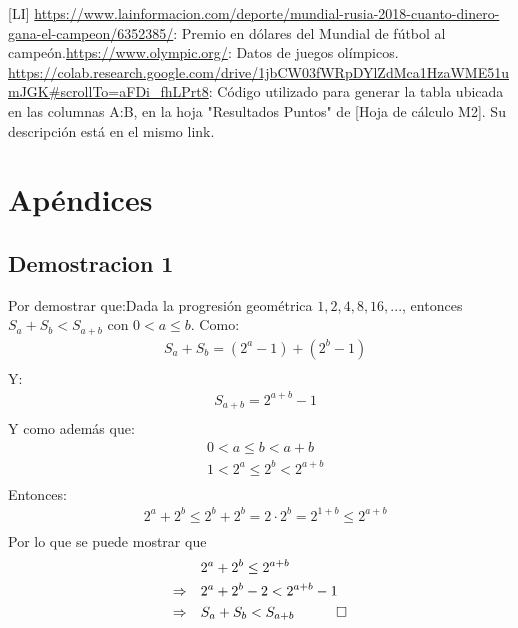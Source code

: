 \documentclass[a4paper]{article}
\begin{document}
[LI] \url{https://www.lainformacion.com/deporte/mundial-rusia-2018-cuanto-dinero-gana-el-campeon/6352385/}: Premio en dólares del Mundial de fútbol al campeón.\newline\newline  [OL] \url{https://www.olympic.org/}: Datos de juegos olímpicos. \newline\newline [Código] \url{https://colab.research.google.com/drive/1jbCW03fWRpDYlZdMca1HzaWME51umJGK#scrollTo=aFDi_fhLPrt8}: Código utilizado para generar la tabla ubicada en las columnas A:B, en la hoja "Resultados Puntos" de [Hoja de cálculo M2]. Su descripción está en el mismo link. 

\newpage
\section{Apéndices}
\subsection{Demostracion 1}
Por demostrar que:\newline\newline Dada la progresión geométrica ${1,2,4,8,16,...}$, entonces $S_{a} + S_{b} <S_{a+b}$ con $0<a\leq b$. \newline
Como:
\begin{align*}
    &S_{a}+S_{b}=(2^{a}-1)+(2^{b}-1)\\ \end{align*} 
Y: \newline 
\begin{align*}
    &S_{a+b}= 2^{a+b}-1\\
\end{align*}
Y como además que:
\begin{align*}
    &0<a\leq b<a+b\\
    &1<2^{a}\leq 2^{b}< 2^{a+b} \\
\end{align*}
Entonces:
\begin{align*}
    &2^{a}+2^{b}\leq 2^{b}+2^{b}= 2\cdot 2^{b} = 2^{1+b} \leq 2^{a+b}\\
\end{align*}  
Por lo que se puede mostrar que 
\begin{align*}
     &2^{a} +2^{b}\leq 2^{a+b}\\
    \Rightarrow\quad &2^{a} +2^{b} -2 < 2 ^{a+b} -1\\
    \Rightarrow\quad &S_{a} +S_{b}<S_{a+b}\quad\qed\\
\end{align*}
\end{document}
